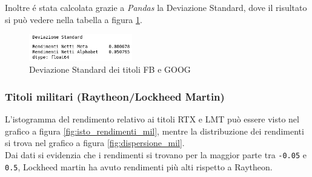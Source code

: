 \documentclass{article}
\begin{document}
Inoltre é stata calcolata grazie a \emph{Pandas} la Deviazione Standard, dove il risultato si può vedere nella tabella a figura \ref{fig:ds_tecno}.

\begin{figure}[h]
  \centering
  \includegraphics[width=0.4\textwidth]{ds_tecno.png}
  \caption{Deviazione Standard dei titoli FB e GOOG}
  \label{fig:ds_tecno}
\end{figure}

\subsubsection{Titoli militari (Raytheon/Lockheed Martin)}

L'istogramma del rendimento relativo ai titoli RTX e LMT può essere visto nel grafico a figura \ref{fig:isto_rendimenti_mil}, mentre la distribuzione dei rendimenti
si trova nel grafico a figura \ref{fig:dispersione_mil}.\\
Dai dati si evidenzia che i rendimenti si trovano per la maggior parte tra \verb|-0.05| e \verb|0.5|, Lockheed martin ha avuto rendimenti più alti rispetto
a Raytheon.
\end{document}
